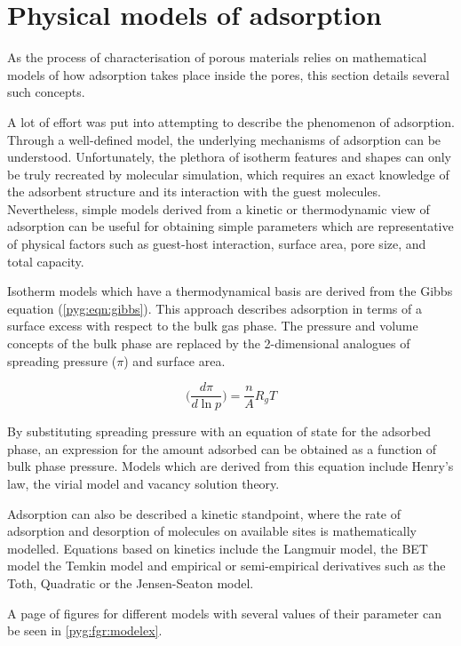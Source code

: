 
\section{Physical models of adsorption}%
\label{pyg:models}

As the process of characterisation of porous materials
relies on mathematical models of how adsorption
takes place inside the pores, this section details
several such concepts.

A lot of effort was put into attempting to describe
the phenomenon of adsorption. Through a well-defined
model, the underlying mechanisms of adsorption can be
understood. Unfortunately, the plethora of isotherm
features and shapes can only be truly recreated
by molecular simulation, which requires an exact
knowledge of the adsorbent structure and its interaction
with the guest molecules. 
Nevertheless, simple models derived from a kinetic or thermodynamic
view of adsorption can be useful for obtaining simple parameters
which are representative of physical factors such as
guest-host interaction, surface area, pore size,
and total capacity.

Isotherm models which have a thermodynamical basis are derived
from the Gibbs equation (\autoref{pyg:eqn:gibbs}). This approach
describes adsorption in terms of a surface excess with respect 
to the bulk gas phase. The pressure and volume concepts of the bulk phase
are replaced by the 2-dimensional analogues of spreading pressure (\( \pi \))
and surface area.

\begin{equation}\label{pyg:eqn:gibbs}
	\Big(\frac{d\pi}{d\ln{p}}\Big) = \frac{n}{A} R_g T
\end{equation}

By substituting spreading pressure with an equation
of state for the adsorbed phase, an expression for the amount
adsorbed can be obtained as a function of bulk phase pressure.
Models which are derived from this equation include
Henry's law, the virial model and vacancy solution theory.

Adsorption can also be described a kinetic standpoint, where 
the rate of adsorption and desorption of molecules on 
available sites is mathematically modelled. Equations based
on kinetics include the Langmuir model, the BET model
the Temkin model and empirical or semi-empirical derivatives 
such as the Toth, Quadratic or the Jensen-Seaton model.

A page of figures for different models with several
values of their parameter can be seen in
\autoref{pyg:fgr:modelex}.


